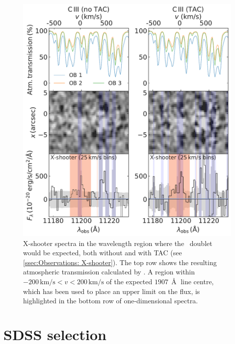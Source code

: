 \begin{figure}
    \centering
    \includegraphics[width=\linewidth]{"Plots/Chapter2/CIII_nondetection"}
    \caption[Non-detections of \CIII]{X-shooter spectra in the wavelength region where the \CIII\ doublet would be expected, both without and with TAC (see \cref{ssec:Observations: X-shooter}). The top row shows the resulting atmospheric transmission calculated by . A region within $-200 \,\mathrm{km/s} < v < 200 \, \mathrm{km/s}$ of the expected $1907 \, \Angstrom$ line centre, which has been used to place an upper limit on the flux, is highlighted in the bottom row of one-dimensional spectra.
    }
    \label{fig:CIII non-detection}
\end{figure}

\section{SDSS selection}
\label{ap:SDSS selection}

